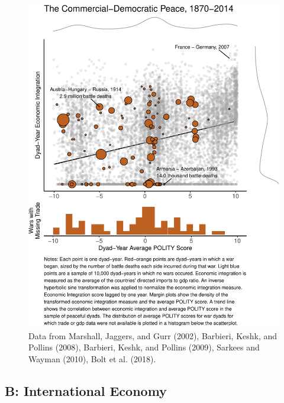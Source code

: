 \documentclass{puthesis}
\begin{document}
\begin{figure}
\centering
\includegraphics{figure/comdempeace-1.pdf}
\caption{Data from Marshall, Jaggers, and Gurr (2002), Barbieri, Keshk,
and Pollins (2008), Barbieri, Keshk, and Pollins (2009), Sarkees and
Wayman (2010), Bolt et al. (2018). \label{fig:comdempeace}}
\end{figure}

\clearpage

\subsection{B: International Economy}
\end{document}
